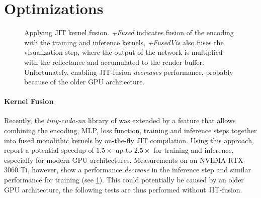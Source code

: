 \section{Optimizations}

\begin{figure}[htb!]
    \centering
    
    \caption{Applying JIT kernel fusion. \emph{+Fused} indicates fusion of the encoding with the training and inference kernels, \emph{+FusedVis} also fuses the visualization step, where the output of the network is multiplied with the reflectance and accumulated to the render buffer. Unfortunately, enabling JIT-fusion \emph{decreases} performance, probably because of the older GPU architecture.}
    \label{fig:jit}
\end{figure}
\paragraph{Kernel Fusion} Recently, the \emph{tiny-cuda-nn} library of \textcite{muller2021a} was extended by a feature that allows combining the encoding, MLP, loss function, training and inference steps together into fused monolithic kernels by on-the-fly JIT compilation.
Using this approach, \textcite{muller2021a} report a potential speedup of $1.5\times$ up to $2.5\times$ for training and inference, especially for modern GPU architectures.
Measurements on an NVIDIA RTX 3060 Ti, however, show a performance \emph{decrease} in the inference step and similar performance for training (see \cref{fig:jit}).
This could potentially be caused by an older GPU architecture, the following tests are thus performed without JIT-fusion.

